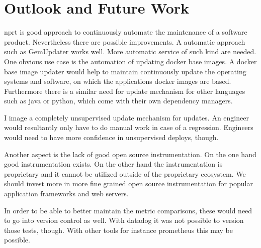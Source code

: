 \section{Outlook and Future Work}

\gls{nprt} is good approach to continuously automate the maintenance of a software
product. Nevertheless there are possible improvements. A automatic approach such as
GemUpdater works well. More automatic service of such kind are needed. One obvious use
case is the automation of updating docker base images. A docker base image updater would
help to maintain continuously update the operating systems and software, on which the
applications docker images are based. Furthermore there is a similar need for update
mechanism for other languages such as java or python, which come with their own dependency
managers.

I image a completely unsupervised update mechanism for updates. An engineer would
resultantly only have to do manual work in case of a regression. Engineers would need to
have more confidence in unsupervised deploys, though.

Another aspect is the lack of good open source instrumentation. On the one hand good
instrumentation exists. On the other hand the instrumentation is proprietary and it cannot
be utilized outside of the proprietary ecosystem. We should invest more in more fine
grained open source instrumentation for popular application frameworks and web servers.

In order to be able to better maintain the metric comparisons, these would need to go into
version control as well. With datadog it was not possible to version those tests,
though. With other tools for instance prometheus this may be possible.

